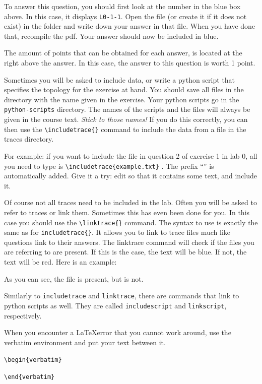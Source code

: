 \begin{exercise}{}

To answer this question, you should first look at the number in the blue box above. In this case, it displays \verb|L0-1-1|. Open the file  (or create it if it does not exist) in the  folder and write down your answer in that file. When you have done that, recompile the pdf. Your answer should now be included in blue.

The amount of points that can be obtained for each answer, is located at the  right above the answer. In this case, the answer to this question is worth 1 point.

Sometimes you will be asked to include data, or write a python script that specifies the topology for the exercise at hand. You should save all files in the  directory with the name given in the exercise. Your python scripts go in the \verb|python-scripts| directory. The names of the scripts and the files will always be given in the course text. \emph{Stick to those names!} If you do this correctly, you can then use the \verb|\includetrace{}| command to include the data from a file in the traces directory.

For example: if you want to include the file  in question 2 of exercise 1 in lab 0, all you need to type is \verb|\includetrace{example.txt}| . The prefix ``'' is automatically added. Give it a try: edit  so that it contains some text, and include it.


Of course not all traces need to be included in the lab. Often you will be asked to refer to traces or link them. Sometimes this has even been done for you. In this case you should use the \verb|\linktrace{}| command. The syntax to use is exactly the same as for \verb|includetrace{}|. It allows you to link to trace files much like questions link to their answers. The linktrace command will check if the files you are referring to are present. If this is the case, the text will be blue. If not, the text will be red. Here is an example:

As you can see, the file  is present, but  is not.

\remark Similarly to \verb|includetrace| and \verb|linktrace|, there are commands that link to python scripts as well. They are called \verb|includescript| and \verb|linkscript|, respectively.

\remark When you encounter a \LaTeX error that you cannot work around, use the verbatim environment and put your text between it.

\verb!\begin{verbatim}!

\verb!\end{verbatim}!

\end{exercise}

